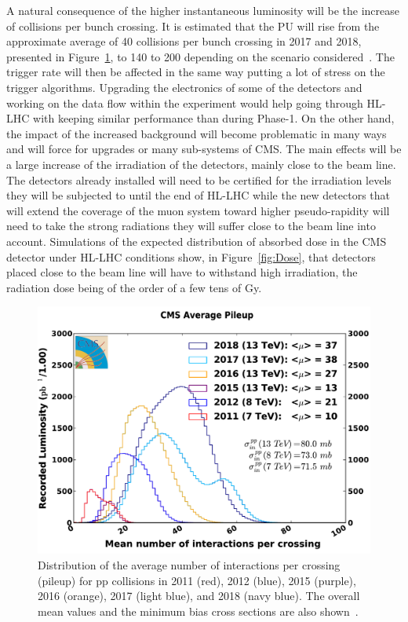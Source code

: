 	A natural consequence of the higher instantaneous luminosity will be the increase of collisions per bunch crossing. It is estimated that the \acl{PU} will rise from the approximate average of 40 collisions per bunch crossing in 2017 and 2018, presented in Figure~\ref{fig:CMS-pileup}, to 140 to 200 depending on the scenario considered~\cite{MEDINAMEDRANO2017}. The trigger rate will then be affected in the same way putting a lot of stress on the trigger algorithms. Upgrading the electronics of some of the detectors and working on the data flow within the experiment would help going through HL-LHC with keeping similar performance than during Phase-1. On the other hand, the impact of the increased background will become problematic in many ways and will force for upgrades or many sub-systems of CMS. The main effects will be a large increase of the irradiation of the detectors, mainly close to the beam line. The detectors already installed will need to be certified for the irradiation levels they will be subjected to until the end of HL-LHC while the new detectors that will extend the coverage of the muon system toward higher pseudo-rapidity will need to take the strong radiations they will suffer close to the beam line into account. Simulations of the expected distribution of absorbed dose in the CMS detector under HL-LHC conditions show, in Figure~\ref{fig:Dose}, that detectors placed close to the beam line will have to withstand high irradiation, the radiation dose being of the order of a few tens of \si{Gy}.
	
\begingroup\setlength{\intextsep}{5pt}\setlength{\columnsep}{15pt}

	\begin{figure}
		\centering
		\includegraphics[width=\linewidth]{fig/chapt3/CMS_pileup_pp_2018.pdf}
		\caption{\label{fig:CMS-pileup} Distribution of the average number of interactions per crossing (pileup) for pp collisions in 2011 (red), 2012 (blue), 2015 (purple), 2016 (orange), 2017 (light blue), and 2018 (navy blue). The overall mean values and the minimum bias cross sections are also shown~\cite{LUMIPUBLICCMS}.}
	\end{figure}

